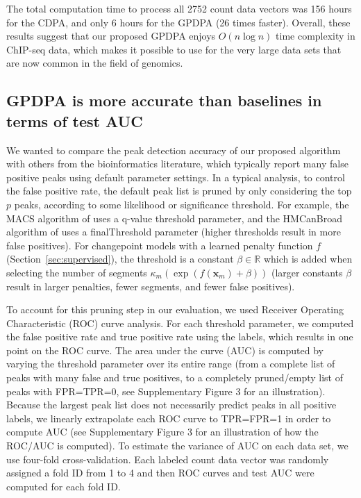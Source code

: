 \documentclass[twoside,11pt]{article}
\newcommand{\RR}{\mathbb R}
\begin{document}
The total computation time to process all 2752 count data vectors was
156 hours for the CDPA, and only 6 hours for the GPDPA (26 times
faster). Overall, these results suggest that our proposed GPDPA enjoys
$O(n\log n)$ time complexity in ChIP-seq data, which makes it possible
to use for the very large data sets that are now common in the field of genomics.


\subsection{GPDPA is more accurate than baselines in terms of test AUC}
\label{sec:test-auc}

We wanted to compare the peak detection accuracy of our proposed
algorithm with others from the bioinformatics literature, which
typically report many false positive peaks using default parameter
settings. 
In a typical analysis, to control the false positive rate, the default
peak list is pruned by only considering the top $p$ peaks, according
to some likelihood or significance threshold. For example, the MACS
algorithm of \citet{MACS} uses a q-value threshold parameter, and the
HMCanBroad algorithm of \citet{HMCan} uses a finalThreshold parameter
(higher thresholds result in more false positives). For changepoint
models with a learned penalty function $f$
(Section~\ref{sec:supervised}), the threshold is a constant $\beta\in\RR$
which is added when selecting the number of segments
$\kappa_m(\exp(f(\mathbf x_m)+\beta))$ (larger constants $\beta$ result in
larger penalties, fewer segments, and fewer false positives). 

To account for this pruning step in our evaluation, we used Receiver
Operating Characteristic (ROC) curve analysis. For each threshold
parameter, we computed the false positive rate and true positive rate
using the labels, which results in one point on the ROC curve. The
area under the curve (AUC) is computed by varying the threshold
parameter over its entire range (from a complete list of peaks with
many false and true positives, to a completely pruned/empty list of
peaks with FPR=TPR=0, see Supplementary Figure 3 for an illustration).
Because the largest peak list does not necessarily predict peaks in
all positive labels, we linearly extrapolate each ROC curve to
TPR=FPR=1 in order to compute AUC (see Supplementary Figure 3 for an
illustration of how the ROC/AUC is computed). To estimate the variance
of AUC on each data set, we use four-fold cross-validation. Each
labeled count data vector was randomly assigned a fold ID from 1 to 4
and then ROC curves and test AUC were computed for each fold ID.
\end{document}
